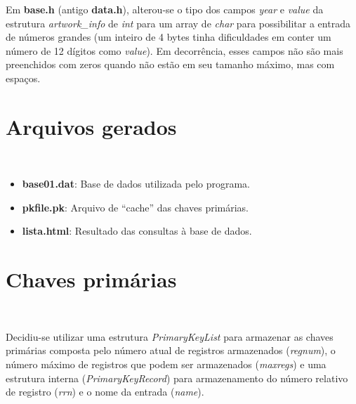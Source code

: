 \documentclass{article}
\begin{document}

Em \textbf{base.h} (antigo \textbf{data.h}), alterou-se o tipo dos campos \textit{year} e \textit{value} da estrutura \textit{artwork\_info} de \textit{int} para um array de \textit{char} para possibilitar a entrada de números grandes (um inteiro de 4 bytes tinha dificuldades em conter um número de 12 dígitos como \textit{value}). Em decorrência, esses campos não são mais preenchidos com zeros quando não estão em seu tamanho máximo, mas com espaços.

\section{Arquivos gerados}\

\begin{itemize}
 \item \textbf{base01.dat}: Base de dados utilizada pelo programa.
 \item \textbf{pkfile.pk}: Arquivo de ``cache'' das chaves primárias.
 \item \textbf{lista.html}: Resultado das consultas à base de dados.
\end{itemize}


\section{Chaves primárias}\

Decidiu-se utilizar uma estrutura \textit{PrimaryKeyList} para armazenar as chaves primárias composta pelo número atual de registros armazenados (\textit{regnum}), o número máximo de registros que podem ser armazenados (\textit{maxregs}) e uma estrutura interna (\textit{PrimaryKeyRecord}) para armazenamento do número relativo de registro (\textit{rrn}) e o nome da entrada (\textit{name}).
\end{document}

